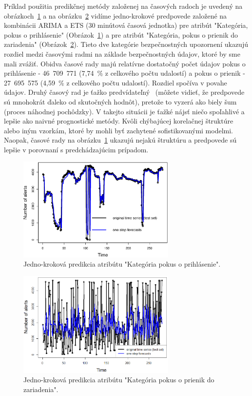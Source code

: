 \documentclass[thesismargins, thesislinespacing, openright, upjsfrontpage, combineabstracts]{rnthesis}
\begin{document}
Príklad použitia predikčnej metódy založenej na časových radoch je uvedený na obrázkoch~\ref{fig:forecast_attempt_login} a na obrázku~\ref{fig:forecast_attempt_exploit} vidíme jedno-krokové predpovede založené na kombinácii ARIMA a ETS (30 minútová časová jednotka) pre atribút "Kategória, pokus o prihlásenie" (Obrázok~\ref{fig:forecast_attempt_login}) a pre atribút "Kategória, pokus o prienik do zariadenia" (Obrázok~\ref{fig:forecast_attempt_exploit}). Tieto dve kategórie bezpečnostných upozornení ukazujú rozdiel medzi časovými radmi na základe bezpečnostných údajov, ktoré by sme mali zvážiť. Obidva časové rady majú relatívne dostatočný počet údajov pokus o prihlásenie - 46~709~771 (7,74~\% z celkového počtu udalostí) a pokus o prienik - 27~695~575 (4,59~\% z celkového počtu udalostí). Rozdiel spočíva v povahe údajov. Druhý časový rad je ťažko predvídateľný~\cite{hendry1995dynamic} (môžete vidieť, že predpovede sú mnohokrát ďaleko od skutočných hodnôt), pretože to vyzerá ako biely šum (proces náhodnej pochôdzky). V takejto situácii je ťažké nájsť niečo spoľahlivé a lepšie ako naivné prognostické metódy. Kvôli chýbajúcej korelačnej štruktúre alebo iným vzorkám, ktoré by mohli byť zachytené sofistikovanými modelmi. Naopak, časové rady na obrázku~\ref{fig:forecast_attempt_login} ukazujú nejakú štruktúru a predpovede sú lepšie v porovnaní s predchádzajúcim prípadom.

\begin{figure}[h]
  \centering
  \includegraphics[width=0.7\textwidth]{images/item61_1step_forecasts_new.eps}
  \caption{Jedno-kroková predikcia atribútu "Kategória pokus o prihlásenie".} 
  \label{fig:forecast_attempt_login}
\end{figure}

\begin{figure}[h]
  \centering
  \includegraphics[width=0.7\textwidth]{images/item62_1step_forecasts_new.eps}
  \caption{Jedno-kroková predikcia atribútu "Kategória pokus o prienik do zariadenia". }
  \label{fig:forecast_attempt_exploit}
\end{figure}
\end{document}

